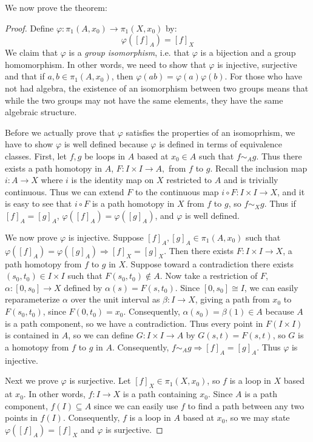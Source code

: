 We now prove the theorem:
\begin{proof}
Define $\varphi:\pi_1(A,x_0)\to \pi_1(X,x_0)$ by:
\[\varphi([f]_A) = [f]_X\]
We claim that $\varphi$ is a \emph{group isomorphism}, i.e. that $\varphi$ is a bijection and a group homomorphism. In other words, we need to show that $\varphi$ is injective, surjective and that if $a,b\in\pi_1(A,x_0)$, then $\varphi(ab) = \varphi(a)\varphi(b)$. 
For those who have not had algebra, the existence of an isomorphism between two groups means that while the two groups may not have the same elements, they have the same algebraic structure. 

Before we actually prove that $\varphi$ satisfies the properties of an isomoprhism, we have to show $\varphi$ is well defined because $\varphi$ is defined in terms of equivalence classes. 
First, let $f,g$ be loops in $A$ based at $x_0\in A$ such that $f\sim_A g$. Thus there exists a path homotopy in $A$, $F:I\times I\to A,$ from $f$ to $g$.
Recall the inclusion map $i:A\to X$ where $i$ is the identity map on $X$ restricted to $A$ and is trivially continuous.
 Thus we can extend $F$ to the continuous map $i\circ F:I\times I \to X$, and it is easy to see that $i\circ F$ is a path homotopy in $X$ from $f$ to $g$, so $f\sim_X g$. Thus if $[f]_A = [g]_A$, $\varphi([f]_A) = \varphi([g]_A)$, and $\varphi$ is well defined.
 
We now prove $\varphi$ is injective. Suppose $[f]_A,[g]_A\in \pi_1(A,x_0)$ such that $\varphi([f]_A) = \varphi([g]_A) \Rightarrow [f]_X = [g]_X$. Then there exists $F:I\times I \to X$, a path homotopy from $f$ to $g$ in $X$. Suppose toward a contradiction there exists $(s_0,t_0)\in I\times I$ such that $F(s_0,t_0)\notin A$. Now take a restriction of $F$, $\alpha:[0,s_0] \to X$ defined by $\alpha(s) = F(s,t_0)$. 
Since $[0,s_0]\cong I$, we can easily reparameterize $\alpha$ over the unit interval as $\beta:I\to X$, giving a path from $x_0$ to $F(s_0,t_0)$, since $F(0,t_0)=x_0$. Consequently, $\alpha(s_0) = \beta(1)\in A$ because $A$ is a path component, so we have a contradiction. Thus every point in $F(I\times I)$ is contained in $A$, so we can define $G:I\times I\to A$ by $G(s,t)=F(s,t)$, so $G$ is a homotopy from $f$ to $g$ in $A$. Consequently, $f\sim_A g \Rightarrow [f]_A = [g]_A$. Thus $\varphi$ is injective.

Next we prove $\varphi$ is surjective. Let $[f]_X\in \pi_1(X,x_0)$, so $f$ is a loop in $X$ based at $x_0$. In other words, $f:I\to X$ is a path containing $x_0$. Since $A$ is a path component, $f(I)\subseteq A$ since we can easily use $f$ to find a path between any two points in $f(I)$. Consequently, $f$ is a loop in $A$ based at $x_0$, so we may state $\varphi([f]_A) = [f]_X$ and $\varphi$ is surjective.


\end{proof}
